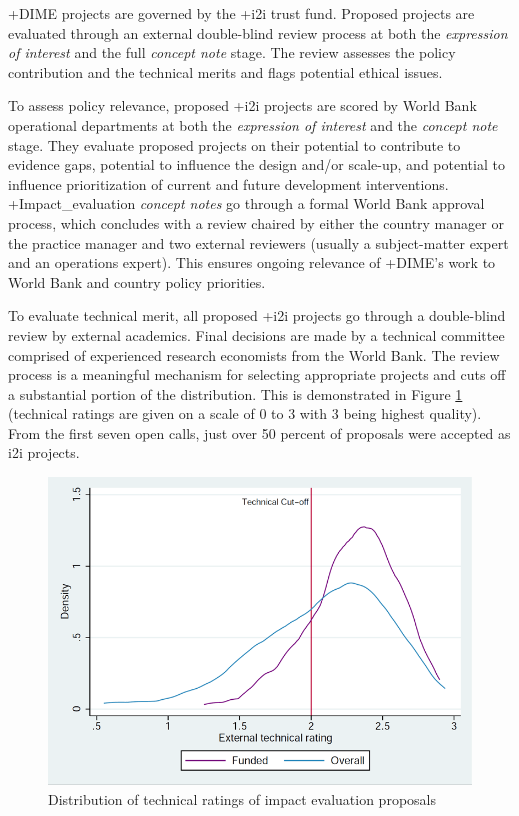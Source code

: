 \documentclass[
]{WileySix}
\begin{document}
+DIME\textbar{} projects are governed by the +i2i\textbar{} trust fund. Proposed projects are evaluated through an external double-blind review process at both the \emph{expression of interest} and the full \emph{concept note} stage. The review assesses the policy contribution and the technical merits and flags potential ethical issues.

To assess policy relevance, proposed +i2i\textbar{} projects are scored by World Bank operational departments at both the \emph{expression of interest} and the \emph{concept note} stage. They evaluate proposed projects on their potential to contribute to evidence gaps, potential to influence the design and/or scale-up, and potential to influence prioritization of current and future development interventions. +Impact\_evaluation\textbar{} \emph{concept notes} go through a formal World Bank approval process, which concludes with a review chaired by either the country manager or the practice manager and two external reviewers (usually a subject-matter expert and an operations expert). This ensures ongoing relevance of +DIME\textbar's work to World Bank and country policy priorities.

To evaluate technical merit, all proposed +i2i\textbar{} projects go through a double-blind review by external academics. Final decisions are made by a technical committee comprised of experienced research economists from the World Bank. The review process is a meaningful mechanism for selecting appropriate projects and cuts off a substantial portion of the distribution. This is demonstrated in Figure \ref{fig:dimefigure5} (technical ratings are given on a scale of 0 to 3 with 3 being highest quality). From the first seven open calls, just over 50 percent of proposals were accepted as i2i projects.

\begin{figure}
\includegraphics[width=1\linewidth]{./assets/dime/dimefigure5web} \caption{Distribution of technical ratings of impact evaluation proposals}\label{fig:dimefigure5}
\end{figure}
\end{document}
